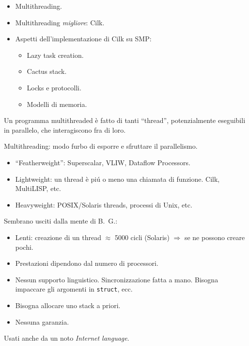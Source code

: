 \documentclass[times,sans-serif]{athenaslides}
\begin{document}
\begin{slide}
  \begin{itemize}
  \item Multithreading.
  \item Multithreading \emph{migliore}: Cilk.
  \item Aspetti dell'implementazione di Cilk su SMP:
    \begin{itemize}
    \item Lazy task creation.
    \item Cactus stack.
    \item Locks e protocolli.
    \item Modelli di memoria.
    \end{itemize}
  \end{itemize}
\end{slide}
\begin{slide}[Multithreading]
  Un programma multithreaded \`e fatto di tanti ``thread'',
  potenzialmente eseguibili in parallelo, che interagiscono
  fra di loro.

  \begin{Red}
    Multithreading: modo furbo di esporre e sfruttare il parallelismo.
  \end{Red}

  \begin{itemize}
  \item ``Featherweight'': Superscalar, VLIW, Dataflow Processors.
  \item Lightweight: un thread \`e pi\'u o meno una chiamata di funzione.
    Cilk, MultiLISP, etc.
  \item Heavyweight: POSIX/Solaris threads, processi di Unix, etc.
  \end{itemize}

\end{slide}
\begin{slide}[OS threads]
  Sembrano usciti dalla mente di B.~G.:

  \begin{itemize}
  \item Lenti: creazione di un thread $\approx$ 5000 cicli (Solaris)
    $\Longrightarrow$ se ne possono creare pochi.
  \item Prestazioni dipendono dal numero di processori.
  \item Nessun supporto linguistico.  Sincronizzazione fatta a mano.
    Bisogna impaccare gli argomenti in \texttt{struct}, ecc.
  \item Bisogna allocare uno stack a priori.
  \item Nessuna garanzia.
  \end{itemize}

  Usati anche da un noto \emph{Internet language}.
\end{slide}  
\end{document}
